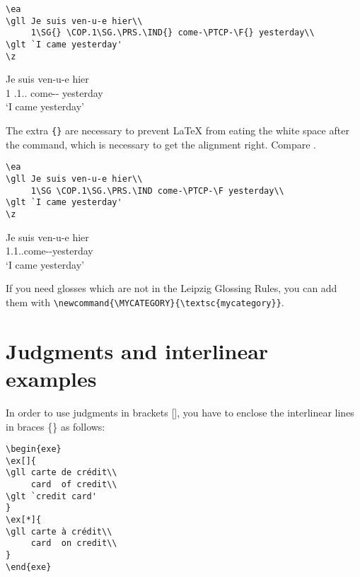 \documentclass[output=paper]{langscibook}
\newcommand{\cmd}[1]{\texttt{\textbackslash#1}}
\begin{document}
\begin{lstlisting}
\ea
\gll Je suis ven-u-e hier\\
     1\SG{} \COP.1\SG.\PRS.\IND{} come-\PTCP-\F{} yesterday\\
\glt `I came yesterday'     
\z
 \end{lstlisting}
\ea
\gll Je suis ven-u-e hier\\
     1\SG{} \COP.1\SG.\PRS.\IND{} come-\PTCP-\F{} yesterday\\
\glt `I came yesterday'     
\z

The extra \texttt{\{\}} are necessary to prevent {\LaTeX} from eating the white space after the command, which is necessary to get the alignment right. Compare .

\begin{lstlisting}
\ea
\gll Je suis ven-u-e hier\\
     1\SG \COP.1\SG.\PRS.\IND come-\PTCP-\F yesterday\\
\glt `I came yesterday'     
\z
 \end{lstlisting}
\ea\label{ex:wrongalignment}
\gll Je suis ven-u-e hier\\
     1\SG \COP.1\SG.\PRS.\IND come-\PTCP-\F yesterday\\
\glt `I came yesterday'     
\z   

If you need glosses which are not in the Leipzig Glossing Rules, you can add them with \cmd{newcommand\{}\cmd{MYCATEGORY\}\{}\cmd{textsc\{mycategory\}\}}.


\section{Judgments and interlinear examples}
In order to use judgments in brackets [], you have to enclose the interlinear lines in braces \{\} as follows:

\begin{minipage}{.55\textwidth}
\begin{lstlisting}
\begin{exe}
\ex[]{
\gll carte de crédit\\ 
     card  of credit\\ 
\glt `credit card'     
}
\ex[*]{
\gll carte à crédit\\ 
     card  on credit\\  
}
\end{exe}
 \end{lstlisting}
\end{minipage}
\parbox{.45\textwidth}{ 
\begin{exe}
\end{exe}
}
\end{document}
